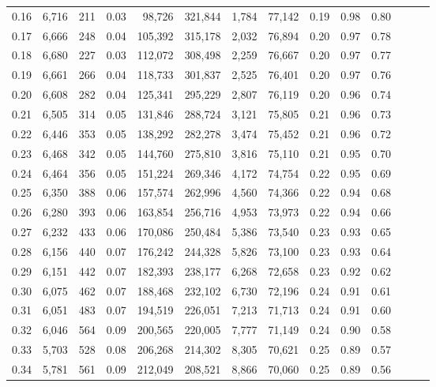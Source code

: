 \begin{tabular}{rrrrrrrrrrrrrr}
0.16 &  6,716 &    211 &  0.03 &   98,726 &  321,844 &   1,784 &  77,142 &  0.19 &  0.98 &      0.80 \\
0.17 &  6,666 &    248 &  0.04 &  105,392 &  315,178 &   2,032 &  76,894 &  0.20 &  0.97 &      0.78 \\
0.18 &  6,680 &    227 &  0.03 &  112,072 &  308,498 &   2,259 &  76,667 &  0.20 &  0.97 &      0.77 \\
0.19 &  6,661 &    266 &  0.04 &  118,733 &  301,837 &   2,525 &  76,401 &  0.20 &  0.97 &      0.76 \\
0.20 &  6,608 &    282 &  0.04 &  125,341 &  295,229 &   2,807 &  76,119 &  0.20 &  0.96 &      0.74 \\
0.21 &  6,505 &    314 &  0.05 &  131,846 &  288,724 &   3,121 &  75,805 &  0.21 &  0.96 &      0.73 \\
0.22 &  6,446 &    353 &  0.05 &  138,292 &  282,278 &   3,474 &  75,452 &  0.21 &  0.96 &      0.72 \\
0.23 &  6,468 &    342 &  0.05 &  144,760 &  275,810 &   3,816 &  75,110 &  0.21 &  0.95 &      0.70 \\
0.24 &  6,464 &    356 &  0.05 &  151,224 &  269,346 &   4,172 &  74,754 &  0.22 &  0.95 &      0.69 \\
0.25 &  6,350 &    388 &  0.06 &  157,574 &  262,996 &   4,560 &  74,366 &  0.22 &  0.94 &      0.68 \\
0.26 &  6,280 &    393 &  0.06 &  163,854 &  256,716 &   4,953 &  73,973 &  0.22 &  0.94 &      0.66 \\
0.27 &  6,232 &    433 &  0.06 &  170,086 &  250,484 &   5,386 &  73,540 &  0.23 &  0.93 &      0.65 \\
0.28 &  6,156 &    440 &  0.07 &  176,242 &  244,328 &   5,826 &  73,100 &  0.23 &  0.93 &      0.64 \\
0.29 &  6,151 &    442 &  0.07 &  182,393 &  238,177 &   6,268 &  72,658 &  0.23 &  0.92 &      0.62 \\
0.30 &  6,075 &    462 &  0.07 &  188,468 &  232,102 &   6,730 &  72,196 &  0.24 &  0.91 &      0.61 \\
0.31 &  6,051 &    483 &  0.07 &  194,519 &  226,051 &   7,213 &  71,713 &  0.24 &  0.91 &      0.60 \\
0.32 &  6,046 &    564 &  0.09 &  200,565 &  220,005 &   7,777 &  71,149 &  0.24 &  0.90 &      0.58 \\
0.33 &  5,703 &    528 &  0.08 &  206,268 &  214,302 &   8,305 &  70,621 &  0.25 &  0.89 &      0.57 \\
0.34 &  5,781 &    561 &  0.09 &  212,049 &  208,521 &   8,866 &  70,060 &  0.25 &  0.89 &      0.56 \\

\end{tabular}
